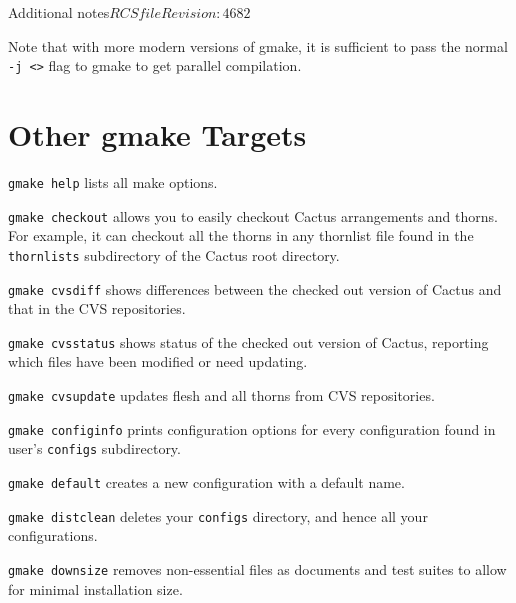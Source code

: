 \begin{cactuspart}{Additional notes}{$RCSfile$}{$Revision: 4682 $}
\begin{Lentry}
\end{Lentry}

Note that with more modern versions of gmake, it is sufficient to pass the
normal \texttt{-j <>} flag to gmake to get parallel compilation.





\section{Other gmake Targets}

\begin{Lentry}

\item [\texttt{gmake help}] lists all make options.

\item [\texttt{gmake checkout}] allows you to easily checkout Cactus
arrangements and thorns.  For example, it can checkout all the thorns
in any thornlist file found in the \texttt{thornlists} subdirectory of
the Cactus root directory. %

\item [\texttt{gmake cvsdiff}] shows differences between the checked out version of Cactus and that in the CVS repositories.

\item [\texttt{gmake cvsstatus}] shows status of the checked out version of Cactus, reporting which files have been modified or need updating.

\item [\texttt{gmake cvsupdate}] updates flesh and all thorns from CVS repositories.

\item [\texttt{gmake configinfo}] prints configuration options for every
configuration found in user's \texttt{configs} subdirectory.

\item [\texttt{gmake default}] creates a new configuration with a default name.

\item [\texttt{gmake distclean}] deletes your \texttt{configs} directory, and hence all your configurations.

\item [\texttt{gmake downsize}] removes non-essential files as documents
  and test suites to allow for minimal installation size.


\end{Lentry}
\end{cactuspart}
